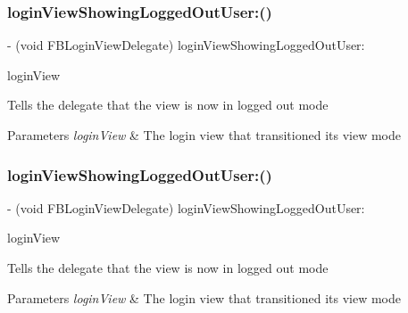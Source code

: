 \subsubsection{\texorpdfstring{login\+View\+Showing\+Logged\+Out\+User\+:()}{loginViewShowingLoggedOutUser:()}\hspace{0.1cm}{\footnotesize\ttfamily [3/5]}}
{\footnotesize\ttfamily -\/ (void F\+B\+Login\+View\+Delegate) login\+View\+Showing\+Logged\+Out\+User\+: \begin{DoxyParamCaption}\item[{(\hyperlink{interfaceFBLoginView}{F\+B\+Login\+View} $\ast$)}]{login\+View }\end{DoxyParamCaption}\hspace{0.3cm}{\ttfamily [optional]}}

Tells the delegate that the view is now in logged out mode


\begin{DoxyParams}{Parameters}
{\em login\+View} & The login view that transitioned its view mode \\
\hline
\end{DoxyParams}
\mbox{\label{protocolFBLoginViewDelegate_01-p_a39d98ab433b5919a9e1e96388bbdc691}} 
\subsubsection{\texorpdfstring{login\+View\+Showing\+Logged\+Out\+User\+:()}{loginViewShowingLoggedOutUser:()}\hspace{0.1cm}{\footnotesize\ttfamily [4/5]}}
{\footnotesize\ttfamily -\/ (void F\+B\+Login\+View\+Delegate) login\+View\+Showing\+Logged\+Out\+User\+: \begin{DoxyParamCaption}\item[{(\hyperlink{interfaceFBLoginView}{F\+B\+Login\+View} $\ast$)}]{login\+View }\end{DoxyParamCaption}\hspace{0.3cm}{\ttfamily [optional]}}

Tells the delegate that the view is now in logged out mode


\begin{DoxyParams}{Parameters}
{\em login\+View} & The login view that transitioned its view mode \\
\hline
\end{DoxyParams}
\mbox{\label{protocolFBLoginViewDelegate_01-p_a39d98ab433b5919a9e1e96388bbdc691}} 
